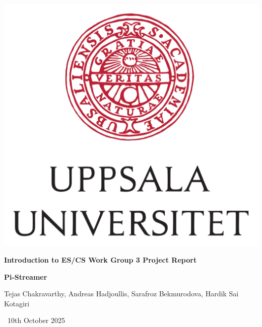 \documentclass[11pt]{article}
\begin{document}
\begin{titlepage}
    \centering
    \includegraphics[scale=0.1]{uu.jpg}\par\vspace{1cm}
    {\large \textbf{Introduction to ES/CS Work Group 3 Project Report}\par}
    {\Huge \textbf{Pi-Streamer}\par}
    \vspace{1cm}
    {\Large Tejas Chakravarthy, Andreas Hadjoullis, Sarafroz Bekmurodova, Hardik Sai Kotagiri\par}
    \vfill
    {\large \ 10th October 2025\par}
\end{titlepage}
\end{document}
